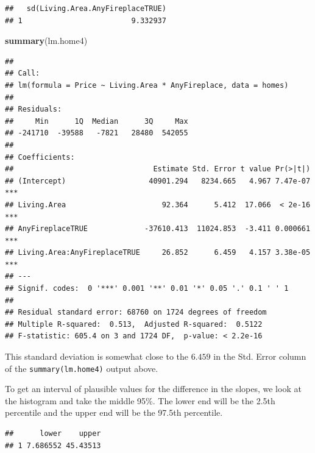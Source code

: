 \documentclass[]{book}
\newenvironment{Shaded}{\begin{snugshade}}{\end{snugshade}}
\newcommand{\DataTypeTok}[1]{\textcolor[rgb]{0.13,0.29,0.53}{#1}}
\newcommand{\FloatTok}[1]{\textcolor[rgb]{0.00,0.00,0.81}{#1}}
\newcommand{\KeywordTok}[1]{\textcolor[rgb]{0.13,0.29,0.53}{\textbf{#1}}}
\newcommand{\NormalTok}[1]{#1}
\newcommand{\OperatorTok}[1]{\textcolor[rgb]{0.81,0.36,0.00}{\textbf{#1}}}
\newcommand{\StringTok}[1]{\textcolor[rgb]{0.31,0.60,0.02}{#1}}
\begin{document}
\begin{verbatim}
##   sd(Living.Area.AnyFireplaceTRUE)
## 1                         9.332937
\end{verbatim}

\begin{Shaded}
\begin{Highlighting}[]
\KeywordTok{summary}\NormalTok{(lm.home4)}
\end{Highlighting}
\end{Shaded}

\begin{verbatim}
## 
## Call:
## lm(formula = Price ~ Living.Area * AnyFireplace, data = homes)
## 
## Residuals:
##     Min      1Q  Median      3Q     Max 
## -241710  -39588   -7821   28480  542055 
## 
## Coefficients:
##                                Estimate Std. Error t value Pr(>|t|)    
## (Intercept)                   40901.294   8234.665   4.967 7.47e-07 ***
## Living.Area                      92.364      5.412  17.066  < 2e-16 ***
## AnyFireplaceTRUE             -37610.413  11024.853  -3.411 0.000661 ***
## Living.Area:AnyFireplaceTRUE     26.852      6.459   4.157 3.38e-05 ***
## ---
## Signif. codes:  0 '***' 0.001 '**' 0.01 '*' 0.05 '.' 0.1 ' ' 1
## 
## Residual standard error: 68760 on 1724 degrees of freedom
## Multiple R-squared:  0.513,  Adjusted R-squared:  0.5122 
## F-statistic: 605.4 on 3 and 1724 DF,  p-value: < 2.2e-16
\end{verbatim}

This standard deviation is somewhat close to the \(6.459\) in the Std. Error column of the \texttt{summary(lm.home4)} output above.

To get an interval of plausible values for the difference in the slopes, we look at the histogram and take the middle 95\%. The lower end will be the 2.5th percentile and the upper end will be the 97.5th percentile.

\begin{Shaded}
\end{Shaded}

\begin{verbatim}
##      lower    upper
## 1 7.686552 45.43513
\end{verbatim}
\end{document}
